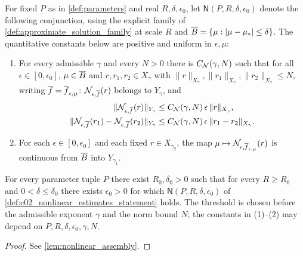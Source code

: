 \begin{definition}
  \label{def:c02_nonlinear_estimates_statement}
  For fixed $P$ as in \cref{def:parameters} and real $R,\delta,\epsilon_0$, let
  $\mathsf N(P,R,\delta,\epsilon_0)$ denote the following conjunction, using the explicit family
  of \cref{def:approximate_solution_family} at scale $R$ and $\overline{B}=\{\mu:|\mu-\mu_*|\le\delta\}$.
  The quantitative constants below are positive and uniform in $\epsilon,\mu$:
  \begin{enumerate}
    \item[(1)--(2)] For every admissible $\gamma$ and every $N>0$ there is $C_{\mathcal{N}}(\gamma,N)$ such that for all
      $\epsilon\in[0,\epsilon_0]$, $\mu\in\overline{B}$ and $r,r_1,r_2\in X_\gamma$ with $\|r\|_{X_\gamma},\|r_1\|_{X_\gamma},\|r_2\|_{X_\gamma}\le N$, writing
      $\overline{f}=\overline{f}_{\epsilon,\mu}$: $\mathcal{N}_{\epsilon,\overline{f}}(r)$ belongs to $Y_\gamma$, and
      \begin{align}
        \|\mathcal{N}_{\epsilon,\overline{f}}(r)\|_{Y_\gamma}&\le C_{\mathcal{N}}(\gamma,N)\,\epsilon\,\|r\|_{X_\gamma},\label{eqn:fixed_point_nonlinear_bound}\\
        \|\mathcal{N}_{\epsilon,\overline{f}}(r_1)-\mathcal{N}_{\epsilon,\overline{f}}(r_2)\|_{Y_\gamma}&\le C_{\mathcal{N}}(\gamma,N)\,\epsilon\,\|r_1-r_2\|_{X_\gamma}.\label{eqn:fixed_point_nonlinear_lipschitz}
      \end{align}
    \item[(3)] For each $\epsilon\in[0,\epsilon_0]$ and each fixed $r\in X_{\gamma_2}$, the map
      $\mu\mapsto\mathcal{N}_{\epsilon,\overline{f}_{\epsilon,\mu}}(r)$ is continuous from $\overline{B}$ into $Y_{\gamma_1}$.
  \end{enumerate}
\end{definition}

\begin{theorem}
  \label{thm:fixed_point_nonlinear_estimates}
  For every parameter tuple $P$ there exist $R_0,\delta_0>0$ such that for every $R\ge R_0$
  and $0<\delta\le\delta_0$ there exists $\epsilon_0>0$ for which
  $\mathsf N(P,R,\delta,\epsilon_0)$ of \cref{def:c02_nonlinear_estimates_statement} holds.
  The threshold is chosen before the admissible exponent $\gamma$ and the norm bound $N$;
  the constants in (1)--(2) may depend on $P,R,\delta,\epsilon_0,\gamma,N$.
\end{theorem}
\begin{proof}
  See \cref{lem:nonlinear_assembly}.
\end{proof}


